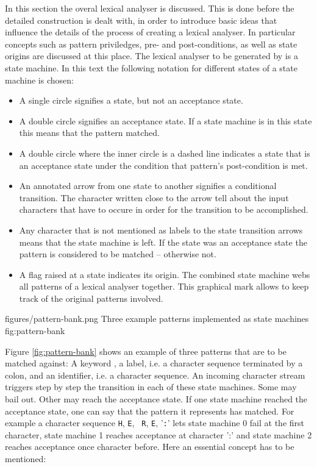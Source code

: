 In this section the overal lexical analyser is discussed. This is done before
the detailed construction is dealt with, in order to introduce basic ideas that
influence the details of the process of creating a lexical analyser. In
particular concepts such as pattern priviledges, pre- and post-conditions, as
well as state origins are discussed at this place.  The lexical analyser to be
generated by {\quex} is a state machine. In this text the following notation for
different states of a state machine is chosen:

\begin{itemize}
\item A single circle signifies a state, but not an acceptance state.
\item A double circle signifies an acceptance state. If a state machine is in this state this
      means that the pattern matched.
\item A double circle where the inner circle is a dashed line indicates a state that is 
      an acceptance state under the condition that pattern's post-condition is met.
\item An annotated arrow from one state to another signifies a conditional transition. The
      character written close to the arrow tell about the input characters that have to occure in order for
      the transition to be accomplished.
\item Any character that is not mentioned as labels to the state transition arrows means that
      the state machine is left. If the state was an acceptance state the pattern is considered
      to be matched -- otherwise not.
\item A flag raised at a state indicates its origin. The combined state machine webs all patterns
      of a lexical analyser together. This graphical mark allows to keep track of the original
      patterns involved.
\end{itemize}

\showpic
{figures/pattern-bank.png}
{Three example patterns implemented as state machines}
{fig:pattern-bank}

Figure \ref{fig:pattern-bank} shows an example of three patterns that are to be matched
against: A keyword , a label, i.e. a character sequence
terminated by a colon, and an identifier, i.e. a character sequence.       An
incoming character stream triggers step by step the transition in each of these
state machines. Some may bail out. Other may reach the acceptance state. If one
state machine reached the acceptance state, one can say that the pattern it
represents has matched. For example a character sequence {\tt H}, {\tt E}, {\tt
    R}, {\tt E}, '{\tt :}' lets state machine 0 fail at the first character,
    state machine 1 reaches acceptance at character ':' and state machine 2
    reaches acceptance once character before. Here an essential concept has to
    be mentioned:

